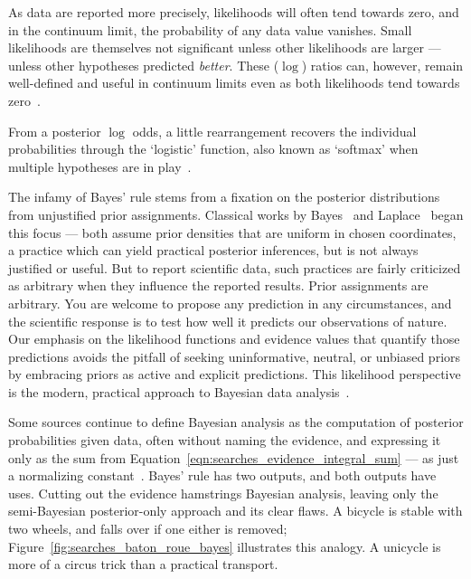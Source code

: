 As data are reported more precisely, likelihoods will often tend towards zero,
and in the continuum limit, the probability of any data value vanishes.
Small likelihoods are themselves not significant unless other likelihoods
are larger --- unless other hypotheses predicted \emph{better}.
These ($\log$) ratios can, however, remain well-defined and useful in continuum
limits even as both likelihoods tend towards
zero~\cite{billingsley2008probability}.

From a posterior $\log$ odds, a little rearrangement recovers the individual
probabilities through the `logistic' function, also known as
`softmax' when multiple hypotheses are in play~\cite{MurphyKevinP.2012Mlap}.

The infamy of Bayes' rule stems from a fixation on the posterior distributions
from unjustified prior assignments.
Classical works by
Bayes~\cite{bayes1763lii} and
Laplace~\cite{laplace1774stigler} began this focus ---
both assume prior densities that are uniform in chosen coordinates, a practice
which can yield practical posterior inferences,
but is not always justified or useful.
But to report scientific data, such practices are fairly criticized as
arbitrary when they influence the reported results.
Prior assignments are arbitrary.
You are welcome to propose any prediction in any circumstances, and the
scientific response is to test how well it predicts our observations of nature.
Our emphasis on the likelihood functions and evidence values that quantify
those predictions avoids the pitfall of seeking uninformative, neutral, or
unbiased priors by embracing priors as active and explicit predictions.
This likelihood perspective is the modern, practical approach to Bayesian data
analysis~\cite{
mackay2003information,
skilling2004nested,
skilling2006nested,
sivia2006data,
skilling2010foundations
}.

Some sources continue to define Bayesian analysis as the computation of
posterior probabilities given data, often without naming the evidence, and
expressing it only as the sum from
Equation~\ref{eqn:searches_evidence_integral_sum}
--- as just a normalizing constant~\cite{
Neyman1937Outline,
gelman1995bayesian,
gelman2008objections,
DAgostini:1994fjx,
DAgostini:2010hil,
cowan1998statistical,
pdg2022ynf
}.
Bayes' rule has two outputs, and both outputs have uses.
Cutting out the evidence hamstrings Bayesian analysis, leaving only the
semi-Bayesian posterior-only approach and its clear flaws.
A bicycle is stable with two wheels, and falls over if one either
is removed;
Figure~\ref{fig:searches_baton_roue_bayes} illustrates this analogy.
A unicycle is more of a circus trick than a practical transport.


